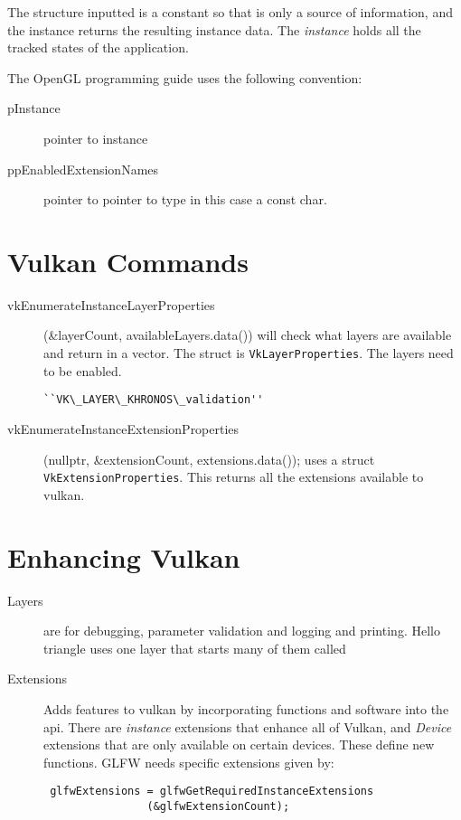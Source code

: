 \documentclass{article}
\begin{document}
The structure inputted is a constant so that is only a source of information, and the
instance returns the resulting instance data.  The \emph{instance} holds all the
tracked states of the application.

The OpenGL programming guide uses the following convention:
\begin{description}
	\item[pInstance]  pointer to instance
	\item[ppEnabledExtensionNames] pointer to pointer to type in this case a
		const char.
\end{description}
\section{Vulkan Commands}

\begin{description}
    \item[vkEnumerateInstanceLayerProperties](\&layer\-Count,
available\-Layers\-.data())
    will check what layers are available and return in a vector. The struct is
    \verb|VkLayerProperties|.  The layers need to be enabled.  \begin{verbatim}
``VK\_LAYER\_KHRONOS\_validation''
\end{verbatim}
\item[vkEnumerateInstanceExtensionProperties] 
	(nullptr, &extensionCount, 
			extensions.data());
 uses a struct \verb|VkExtensionProperties|. This returns all the extensions
available to vulkan.

\end{description}
\section{Enhancing Vulkan}
\begin{description}
\item[Layers] are for
debugging, parameter validation and logging and printing. Hello triangle uses
one layer that starts many of them called  

\item[Extensions]
Adds features to vulkan by incorporating functions and software into the api.
There are \emph{instance} extensions that enhance all of Vulkan, and
\emph{Device} extensions that are only available on certain devices. These
define new functions. GLFW needs specific extensions given by:
\begin{verbatim}
 glfwExtensions = glfwGetRequiredInstanceExtensions
				(&glfwExtensionCount);
\end{verbatim}
\end{description}
\end{document}
